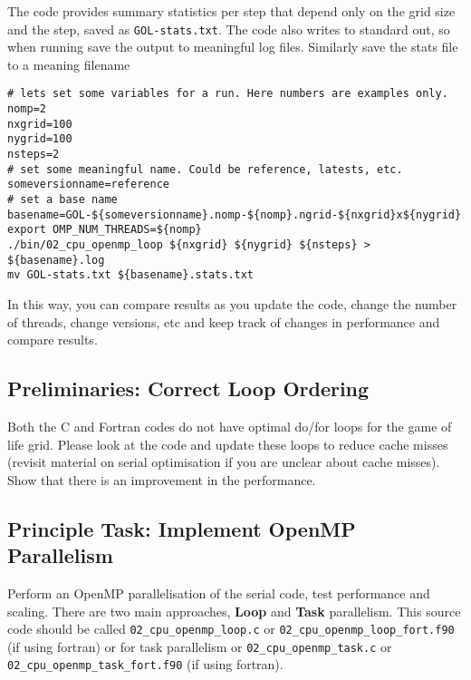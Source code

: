 \documentclass[11pt]{amsart}
\begin{document}
The code provides summary statistics per step that depend only on the grid size and the step, saved as {\color{blue}\texttt{GOL-stats.txt}}. The code also writes to standard out, so when running save the output to meaningful log files. Similarly save the stats file to a meaning filename
\begin{center}
\begin{minipage}{0.95\textwidth}
\begin{verbatim}
# lets set some variables for a run. Here numbers are examples only.
nomp=2
nxgrid=100
nygrid=100
nsteps=2
# set some meaningful name. Could be reference, latests, etc.
someversionname=reference
# set a base name
basename=GOL-${someversionname}.nomp-${nomp}.ngrid-${nxgrid}x${nygrid}.${nsteps}
export OMP_NUM_THREADS=${nomp}
./bin/02_cpu_openmp_loop ${nxgrid} ${nygrid} ${nsteps} > ${basename}.log
mv GOL-stats.txt ${basename}.stats.txt
\end{verbatim}
\end{minipage}
\end{center}
In this way, you can compare results as you update the code, change the number of threads, change versions, etc and keep track of changes in performance and compare results.

\subsection{{\color{Red} Preliminaries}: Correct Loop Ordering\nopunct\\}\label{sec:tasks:loop}
Both the C and Fortran codes do not have optimal do/for loops for the game of life grid. Please look at the code and update these loops to reduce cache misses (revisit material on serial optimisation if you are unclear about cache misses). Show that there is an improvement in the performance.

\subsection{{\color{Red} Principle Task}: Implement OpenMP Parallelism\nopunct\\}\label{sec:tasks:omp}
Perform an OpenMP parallelisation of the serial code, test performance and scaling. There are two main approaches, {\color{Orange}\textbf{Loop}} and {\color{Orange}\textbf{Task}} parallelism. This source code should be called \texttt{02\_cpu\_openmp\_loop.c} or \texttt{02\_cpu\_openmp\_loop\_fort.f90} (if using fortran) or for task parallelism or \texttt{02\_cpu\_openmp\_task.c} or \texttt{02\_cpu\_openmp\_task\_fort.f90} (if using fortran).
\end{document}
